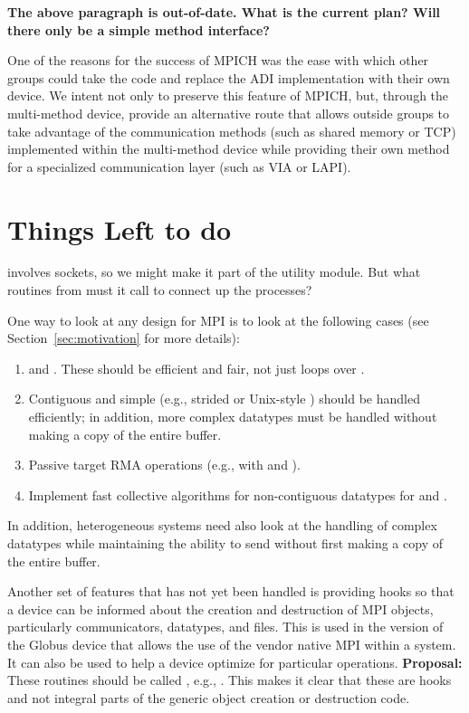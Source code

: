 \documentclass{article}
\begin{document}
\textbf{The above paragraph is out-of-date.  What is the current plan?
Will there only be a simple method interface?}

One of the reasons for the success of MPICH was the ease with which
other groups could take the code and replace the ADI implementation
with their own device.  We intent not only to preserve this feature of
MPICH, but, through the multi-method device, provide an alternative
route that allows outside groups to take advantage of the
communication methods (such as shared memory or TCP) implemented
within the multi-method device while providing their own method for a
specialized communication layer (such as VIA or LAPI).

\section{Things Left to do}

 involves sockets, so we might make it part of the
utility module.  But what routines from  must it call
to connect up the processes?

One way to look at any design for MPI is to look at the following
cases (see Section~\ref{sec:motivation} for more details):
\begin{enumerate}
\item {} and .  These should be
efficient and fair, not just loops over .
\item Contiguous and simple (e.g., strided or Unix-style ) should 
be handled efficiently; in addition, more complex datatypes must be handled
without making a copy of the entire buffer.  
\item Passive target RMA operations (e.g.,  with
 and ).
\item Implement fast collective algorithms for non-contiguous
datatypes for  and .
\end{enumerate}
In addition, heterogeneous systems need also look at the handling of
complex datatypes while maintaining the ability to send without first
making a copy of the entire buffer.

Another set of features that has not yet been handled is providing
hooks so that a device can be informed about the creation and
destruction of MPI objects, particularly communicators, datatypes, and
files.  This is used in the version of the Globus device that allows
the use of the vendor native MPI within a system.  It can also be used
to help a device optimize for particular operations.  
\textbf{Proposal:} These routines should be called
, e.g., .  This makes
it clear that these are hooks and not integral parts of the generic
object creation or destruction code.
\end{document}
